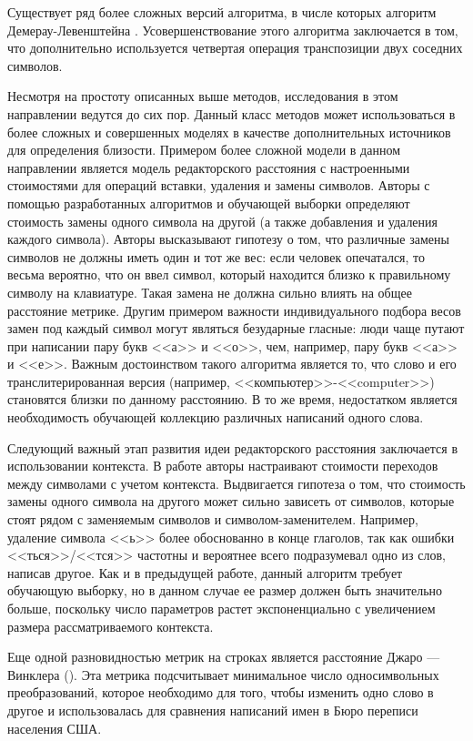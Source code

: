 Существует ряд более сложных версий алгоритма, в числе которых алгоритм Демерау-Левенштейна \cite{leven_dem}. Усовершенствование этого алгоритма заключается в том, что дополнительно используется четвертая операция транспозиции двух соседних символов.

Несмотря на простоту описанных выше методов, исследования в этом направлении ведутся до сих пор. Данный класс методов может использоваться в более сложных и совершенных моделях в качестве дополнительных источников для определения близости. Примером более сложной модели в данном направлении является модель редакторского расстояния с настроенными стоимостями для операций вставки, удаления и замены символов.
Авторы \cite{learn_leven} с помощью разработанных алгоритмов и обучающей выборки определяют стоимость замены одного символа на другой (а также добавления и удаления каждого символа). Авторы высказывают гипотезу о том, что различные замены символов не должны иметь один и тот же вес: если человек опечатался, то весьма вероятно, что он ввел символ, который находится близко к правильному символу на клавиатуре. Такая замена не должна сильно влиять на общее расстояние метрике. Другим примером важности индивидуального подбора весов замен под каждый символ могут являться безударные гласные: люди чаще путают при написании пару букв <<а>> и <<о>>, чем, например, пару букв <<а>> и <<е>>. Важным достоинством такого алгоритма является то, что слово и его транслитерированная версия (например, <<компьютер>>-<<computer>>) становятся близки по данному расстоянию. В то же время, недостатком является необходимость обучающей коллекцию различных написаний одного слова.

Следующий важный этап развития идеи редакторского расстояния заключается в использовании контекста. В работе \cite{context_leven} авторы настраивают стоимости переходов между символами с учетом контекста. Выдвигается гипотеза о том, что стоимость замены одного символа на другого может сильно зависеть от символов, которые стоят рядом с заменяемым символов и символом-заменителем. Например, удаление символа <<ь>> более обоснованно в конце глаголов, так как ошибки <<ться>>/<<тся>> частотны и вероятнее всего подразумевал одно из слов, написав другое. Как и в предыдущей работе, данный алгоритм требует обучающую выборку, но в данном случае ее размер должен быть значительно больше, поскольку число параметров растет экспоненциально с увеличением размера рассматриваемого контекста.

Еще одной разновидностью метрик на строках является расстояние Джаро — Винклера (\cite{jaro1,jaro2}). Эта метрика подсчитывает минимальное число односимвольных преобразований, которое необходимо для того, чтобы изменить одно слово в другое и использовалась для сравнения написаний имен в Бюро переписи населения США.

